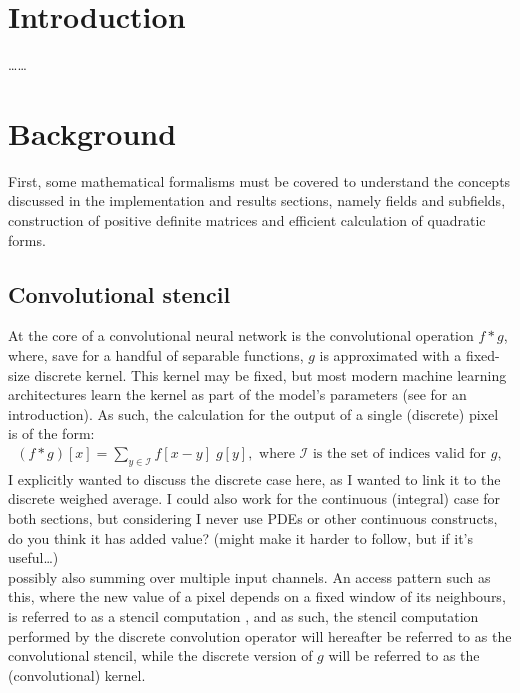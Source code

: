 \documentclass[a4paper, 12pt]{report}
\def\comment#1{\color{red}#1\color{black}}
\begin{document}
\newpage



\setcounter{page}{1}
\pagestyle{plain} 

\chapter{Introduction}
\comment{\ldots\ldots}

\chapter{Background}
First, some mathematical formalisms must be covered to understand the concepts discussed in the implementation and results sections, namely fields and subfields, construction of positive definite matrices and efficient calculation of quadratic forms.

\section{Convolutional stencil}
At the core of a convolutional neural network is the convolutional operation $f*g$, where, save for a handful of separable functions, $g$ is approximated with a fixed-size discrete kernel. This kernel may be fixed, but most modern machine learning architectures learn the kernel as part of the model's parameters (see \cite{introconvnets} for an introduction). As such, the calculation for the output of a single (discrete) pixel is of the form:
\begin{align*}
(f*g)[x] = \sum_{y\in\mathcal{I}} f[x-y]\; g[y]	, \textrm{ where } \mathcal{I} \textrm{ is the set of indices valid for }g,
\end{align*}
\comment{I explicitly wanted to discuss the discrete case here, as I wanted to link it to the discrete weighed average. I could also work for the continuous (integral) case for both sections, but considering I never use PDEs or other continuous constructs, do you think it has added value? (might make it harder to follow, but if it's useful\ldots) \\}
possibly also summing over multiple input channels. An access pattern such as this, where the new value of a pixel depends on a fixed window of its neighbours, is referred to as a stencil computation \cite{fortranstencils}, and as such, the stencil computation performed by the discrete convolution operator will hereafter be referred to as the convolutional stencil, while the discrete version of $g$ will be referred to as the (convolutional) kernel.
\end{document}
